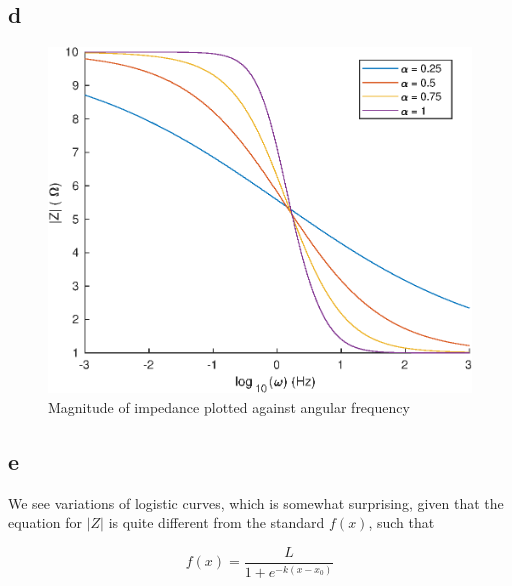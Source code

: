 \subsection{d}
\begin{figure}[h]
    \centering
    \includegraphics[scale=0.9, center]{./eps/topic4_d.eps}
    \caption{Magnitude of impedance plotted against angular frequency}
    \label{fig:Topic4-d}
\end{figure}
\pagebreak


\subsection{e}
We see variations of logistic curves, which is somewhat surprising, given that the equation for $|Z|$ is quite different from the standard $f(x)$, such that

\begin{equation}
	f(x) = \frac{L}{1+e^{-k(x-x_0)}}
\end{equation} 